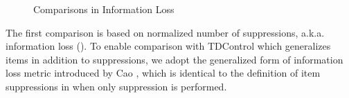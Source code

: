 \begin{figure}[th]
\centering
{}
\caption{Comparisons in Information Loss}\label{fig:loss}
\end{figure}
The first comparison is based on normalized number of suppressions, a.k.a.
information loss ().
To enable comparison with TDControl which generalizes items in addition to
suppressions, we adopt the generalized form of information loss metric introduced
 by Cao \etal \cite{Cao:2010:rho}, which is identical to the definition of
item suppressions in  when
 only suppression is performed.



